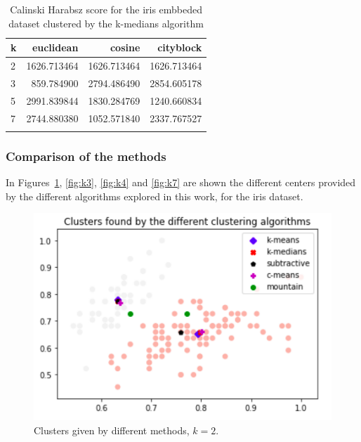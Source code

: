 \documentclass[conference]{IEEEtran}
\begin{document}
\begin{table}[ht!]
    \centering
    \begin{tabular}{lrrr}
    \toprule
    k &    euclidean &       cosine &    cityblock \\
    \midrule
    2 &  1626.713464 &  1626.713464 &  1626.713464 \\
    3 &   859.784900 &  2794.486490 &  2854.605178 \\
    5 &  2991.839844 &  1830.284769 &  1240.660834 \\
    7 &  2744.880380 &  1052.571840 &  2337.767527 \\
    \bottomrule \\
    \end{tabular}

    \caption{Calinski Harabsz score for the iris embbeded dataset clustered by the k-medians algorithm}
    \label{tab:ie_ch_k}
\end{table}

\subsubsection{Comparison of the methods}
In Figures~\ref{fig:k2}, \ref{fig:k3}, \ref{fig:k4} and \ref{fig:k7} are shown the different centers provided by the different algorithms explored in this work, for the iris dataset.
\begin{figure}[ht!]
    \centering
    \includegraphics[scale = 0.4]{figures/iris/k2.png}
    \caption{Clusters given by different methods, $k = 2$.}
    \label{fig:k2}
\end{figure}
\end{document}
